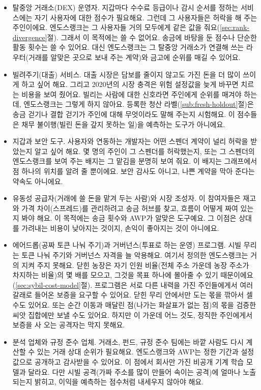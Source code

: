 \begin{itemize}
\item 탈중앙 거래소(DEX) 운영자. 지갑마다 수수료 등급이나 감시 순서를 정하는 서비스에는 자기 사용자에 대한 점수가 필요해요. 그런데 그 사용자들은 허락을 해 주는 주인이에요. 엔도스랭크는 그 사용자들 거의 모두에게 같은 값을 줘요(\ref{sec:rank-divergence}절). 그래서 이 목적에는 쓸 수 없어요. 송금에 바탕을 둔 점수나 단순한 활동 횟수는 쓸 수 있어요. 대신 엔도스랭크는 그 탈중앙 거래소가 연결해 쓰는 라우터(거래를 알맞은 곳으로 보내 주는 계약)와 금고에 순위를 매길 수 있어요.
\item 빌려주기(대출) 서비스. 대출 시장은 담보를 줄이지 않고도 가진 돈을 더 많이 쓰이게 하고 싶어 해요. 그리고 2020년의 시장 충격은 위험 설정값을 늦게 바꾸면 치르는 비용을 보여 줬어요. 빌리는 사람에 대한 신호라면 주인에게 순위를 매겨야 하는데, 엔도스랭크는 그렇게 하지 않아요. 등록한 청산 라벨(\ref{sub:fresh-holdout}절)은 송금 걷기나 결합 걷기가 주인에 대해 무엇이라도 말해 주는지 시험해요. 이 점수들은 채무 불이행(빌린 돈을 갚지 못하는 일)을 예측하는 도구가 아니에요.
\item 지갑과 보안 도구. 사용자와 연동하는 개발자는 어떤 스펜더 계약이 널리 허락을 받았는지 알고 싶어 해요. 몇 명의 주인이 그 스펜더를 허락했는지, 또는 그 스펜더의 엔도스랭크를 보여 주는 배지는 그 맡김을 분명히 보여 줘요. 이 배지는 그래프에서 점 하나의 위치를 알려 줄 뿐이에요. 보안 감사도 아니고, 나쁜 계약을 막아 준다는 약속도 아니에요.
\item 유동성 공급자(거래에 쓸 돈을 맡겨 두는 사람)와 시장 조성자. 이 참여자들은 재고와 가격 차이(스프레드)를 관리하려고 송금 허브를 찾고, 흐름이 어떻게 짜여 있는지 봐야 해요. 이 목적에는 송금 횟수와 AWP가 알맞은 도구예요. 그 이점은 상대를 가려내는 비용이 낮아지는 것이지, 손익이 좋아지는 것이 아니에요.
\item 에어드롭(공짜 토큰 나눠 주기)과 거버넌스(투표로 하는 운영) 프로그램. 시빌 무리는 토큰 나눠 주기와 거버넌스 자격을 늘 악용해요. 여기서 정의한 엔도스랭크는 거의 지켜 주지 못해요. 닫힌 농장은 자기 인원 비율(전체 주소 가운데 농장 주소가 차지하는 비율)의 몇 배를 모으고, 그것을 목표 하나에 몰아줄 수 있기 때문이에요(\ref{sec:sybil-cost-model}절). 프로그램은 서로 다른 내력을 가진 주인들에게서 여러 갈래로 들어온 보증을 요구할 수 있어요. 닫힌 무리 안에서만 도는 몫을 깎아서 셀 수도 있어요. 또는 순간 이동과 매달린 점(나가는 화살표가 없는 점)의 몫을 검증한 씨앗 집합에만 보낼 수도 있어요. 하지만 이 가운데 어느 것도, 정직한 주인에게서 보증을 사 오는 공격자는 막지 못해요.
\item 분석 업체와 규정 준수 업체. 거래소, 펀드, 규정 준수 팀에는 바깥 사람도 다시 계산할 수 있는 거래 상대 순위가 필요해요. 엔도스랭크와 AWP는 정한 기간과 설정값으로 공개하고 감사받을 수 있어요. 이 점에서 회사만 가진 비공개 기계 학습 모델과 달라요. 다만 시빌 공격(가짜 주소를 많이 만들어 속이는 공격)에 얼마나 노출되는지 밝히고, 이익을 예측하는 점수처럼 내세우지 않아야 해요.
\end{itemize}

